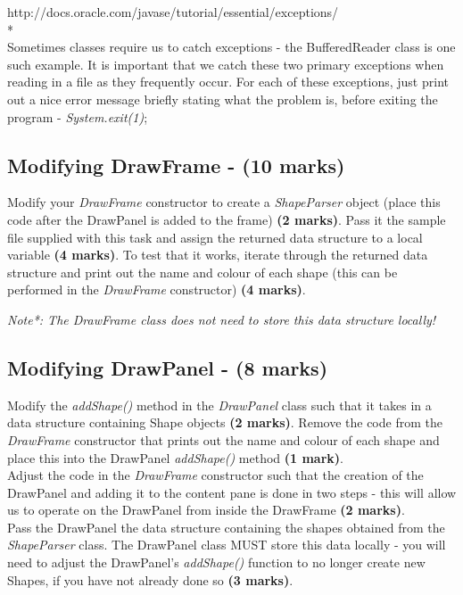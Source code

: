 \documentclass[a4paper,12pt]{article}
\begin{document}
http://docs.oracle.com/javase/tutorial/essential/exceptions/\\*
\\
Sometimes classes require us to catch exceptions - the BufferedReader class is one such example. It is important that we catch these two primary exceptions when reading in a file as they frequently occur. For each of these exceptions, just print out a nice error message briefly stating what the problem is, before exiting the program - \textit{System.exit(1)};

\newpage
\subsection{Modifying DrawFrame - (10 marks)}
Modify your \textit{DrawFrame} constructor to create a \textit{ShapeParser} object (place this code after the DrawPanel is added to the frame) {\bf (2 marks)}. Pass it the sample file supplied with this task and assign the returned data structure to a local variable {\bf (4 marks)}. To test that it works, iterate through the returned data structure and print out the name and colour of each shape (this can be performed in the \textit{DrawFrame} constructor) {\bf (4 marks)}.

\textit{Note*: The DrawFrame class does not need to store this data structure locally!}

\subsection{Modifying DrawPanel - (8 marks)}
Modify the \textit{addShape()} method in the \textit{DrawPanel} class such that it takes in a data structure containing Shape objects {\bf (2 marks)}. Remove the code from the \textit{DrawFrame} constructor that prints out the name and colour of each shape and place this into the DrawPanel \textit{addShape()} method {\bf (1 mark)}.\\

Adjust the code in the \textit{DrawFrame} constructor such that the creation of the DrawPanel and adding it to the content pane is done in two steps - this will allow us to operate on the DrawPanel from inside the DrawFrame {\bf (2 marks)}.\\

Pass the DrawPanel the data structure containing the shapes obtained from the \textit{ShapeParser} class. The DrawPanel class MUST store this data locally - you will need to adjust the DrawPanel's \textit{addShape()} function to no longer create new Shapes, if you have not already done so {\bf (3 marks)}.
\end{document}
